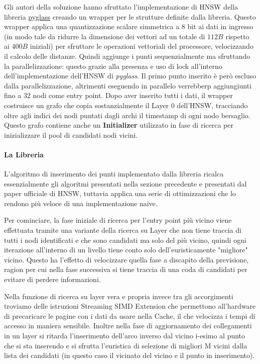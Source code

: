 Gli autori della soluzione hanno sfruttato l'implementazione di HNSW della libreria \href{https://github.com/zilliztech/pyglass/tree/master}{pyglass} creando un wrapper per le strutture definite dalla libreria.
Questo wrapper applica una quantizzazione scalare simmetrica a $8$ bit ai dati in ingresso (in modo tale da ridurre la dimensione 
dei vettori ad un totale di $112 B$ rispetto ai $400 B$ iniziali) per sfruttare le operazioni vettoriali del processore, velocizzando il calcolo delle distanze.
Quindi aggiunge i punti sequenzialmente ma sfruttando la parallelizzazione: questo grazie alla presenza e uso di lock all'interno dell'implementazione dell'HNSW di \textit{pyglass}.
Il primo punto inserito \`e per\`o escluso dalla parallelizzazione, altrimenti eseguendo in parallelo verrebberp aggiungiunti fino a 32 nodi come entry point.
Dopo aver inserito tutti i dati, il wrapper costruisce un grafo che copia sostanzialmente il Layer 0 dell'HNSW, tracciando oltre agli indici dei nodi puntati dagli archi il timestamp di ogni nodo bersaglio.
Questo grafo contiene anche un \textbf{Initializer} utilizzato in fase di ricerca per inizializzare il pool di candidati nodi vicini.

\paragraph{La Libreria}

L'algoritmo di inserimento dei punti implementato dalla libreria ricalca essenzialmente gli algoritmi presentati nella sezione precedente e presentati dal paper ufficiale di HNSW, tuttavia applica una serie di ottimizzazioni che lo rendono pi\`u veloce di una implementazione naive.

Per cominciare, la fase iniziale di ricerca per l'entry point pi\`u vicino viene effettuata tramite una variante della ricerca su Layer che non tiene traccia di tutti i nodi identificati e che sono candidati ma solo del pi\`u vicino, quindi ogni iterazione all'interno di un livello tiene conto solo dell'euristicamente "migliore" vicino.
Questo ha l'effetto di velocizzare quella fase a discapito della previsione, ragion per cui nella fase successiva si tiene traccia di una coda di candidati per evitare di perdere informazioni.

Nella funzione di ricerca su layer vera e propria invece tra gli accorgimenti troviamo delle istruzioni Streaming SIMD Extension che permettono all'hardware di precaricare le pagine con i dati da usare nella Cache, il che velocizza i tempi di accesso in maniera sensibile.
Inoltre nella fase di aggiornamento dei collegamenti in un layer si ritarda l'inserimento dell'arco inverso dal vicino i-esimo al punto che si sta inserendo e si sfrutta l'euristica di selezione di migliori M vicini dalla lista dei candidati (in questo caso il vicinato del vicino e il punto in inserimento).

